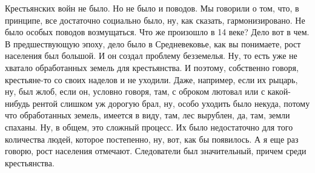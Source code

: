Крестьянских
войн не было. Но не было и поводов. Мы говорили о том, что, в принципе, все
достаточно социально было, ну, как сказать, гармонизировано. Не было особых поводов возмущаться. 
Что же произошло в 14 веке? Дело вот в чем. В
предшествующую эпоху, дело было в Средневековье, как вы понимаете, рост
населения был большой. И он создал проблему безземелья. Ну, то есть уже не
хватало обработанных земель для крестьянства. И поэтому, собственно говоря,
крестьяне-то со своих наделов и не уходили. Даже, например, если их рыцарь, ну,
был жлоб, если он, условно говоря, там, с оброком лютовал или с какой-нибудь
рентой слишком уж дорогую брал, ну, особо уходить было некуда, потому что
обработанных земель, имеется в виду, там, лес вырублен, да, там, земли спаханы.
Ну, в общем, это сложный процесс. Их было недостаточно для того количества
людей, которое постепенно, ну, вот, как бы появилось. А я еще раз говорю, рост
населения отмечают. Следователи был значительный, причем среди крестьянства.

